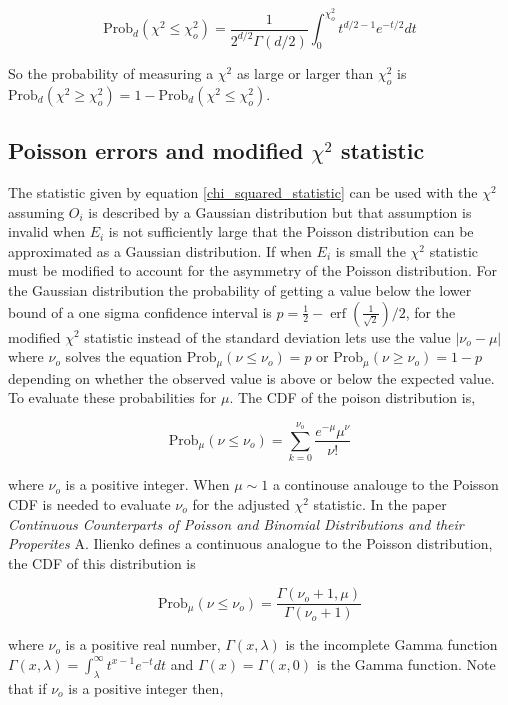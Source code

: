 \documentclass[%
 reprint,
 amsmath,amssymb,
 aps,
]{revtex4-1}
\begin{document}
\begin{equation}
\text{Prob}_d(\chi^2 \leq \chi_o^2)=\frac{1}{2^{d/2}\Gamma(d/2)}\int_0^{\chi_o^2} t^{d/2-1}e^{-t/2}dt
\label{chi_squared_prob}
\end{equation}

So the probability of measuring a $\chi^2$ as large or larger than $\chi_o^2$ is $\text{Prob}_d(\chi^2 \geq \chi_o^2)=1-\text{Prob}_d(\chi^2 \leq \chi_o^2)$.

\subsection{Poisson errors and modified $\chi^2$ statistic}
The statistic given by equation \eqref{chi_squared_statistic} can be used with the $\chi^2$ assuming $O_i$ is described by a Gaussian distribution but that assumption is invalid when $E_i$ is not sufficiently large that the Poisson distribution can be approximated as a Gaussian distribution. If when $E_i$ is small the $\chi^2$ statistic must be modified to account for the asymmetry of the Poisson distribution. For the Gaussian distribution the probability of getting a value below the lower bound of a one sigma confidence interval is $p=\frac{1}{2} - \operatorname{erf}({\frac{1}{\sqrt{2}}})/2$, for the modified $\chi^2$ statistic instead of the standard deviation lets use the value $\left|\nu_o - \mu\right|$ where $\nu_o$ solves the equation $\text{Prob}_\mu\left(\nu \leq \nu_o\right)=p$ or $\text{Prob}_\mu\left(\nu \geq \nu_o\right)=1-p$ depending on whether the observed value is above or below the expected value. To evaluate these probabilities for $\mu$. The CDF of the poison distribution is,

\[
\text{Prob}_\mu\left(\nu \leq \nu_o\right)=\sum_{k=0}^{\nu_o}\frac{e^{-\mu}\mu^\nu}{\nu!}
\]

where $\nu_o$ is a positive integer. When $\mu \sim 1$ a continouse analouge to the Poisson CDF is needed to evaluate $\nu_o$ for the adjusted $\chi^2$ statistic. In the paper \textit{Continuous Counterparts of Poisson and Binomial Distributions and their Properites}\cite{continuous_poisson_paper} A. Ilienko defines a continuous analogue to the Poisson distribution, the CDF of this distribution is

\[
\text{Prob}_\mu\left(\nu \leq \nu_o\right)=\frac{\Gamma(\nu_o+1, \mu)}{\Gamma(\nu_o + 1)}
\]

where $\nu_o$ is a positive real number, $\Gamma(x, \lambda)$ is the incomplete Gamma function $\Gamma(x, \lambda)=\int_\lambda^\infty t^{x-1}e^{-t}dt$ and $\Gamma(x)=\Gamma(x, 0)$ is the Gamma function. Note that if $\nu_o$ is a positive integer then,
\end{document}

